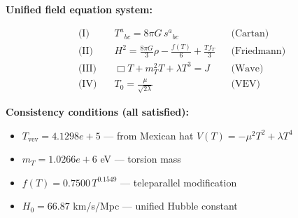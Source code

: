 
\textbf{Unified field equation system:}

\begin{align}
  \text{(I)} \quad & T^a{}_{bc} = 8\pi G \, s^a{}_{bc} && \text{(Cartan)} \\
  \text{(II)} \quad & H^2 = \frac{8\pi G}{3}\rho - \frac{f(T)}{6} + \frac{Tf_T}{3} && \text{(Friedmann)} \\
  \text{(III)} \quad & \Box T + m_T^2 T + \lambda T^3 = J && \text{(Wave)} \\
  \text{(IV)} \quad & T_0 = \frac{\mu}{\sqrt{2\lambda}} && \text{(VEV)}
\end{align}

\textbf{Consistency conditions (all satisfied):}
\begin{itemize}
  \item $T_{\text{vev}} = 4.1298e+5$ — from Mexican hat $V(T) = -\mu^2 T^2 + \lambda T^4$
  \item $m_T = 1.0266e+6$ eV — torsion mass
  \item $f(T) = 0.7500 \, T^{0.1549}$ — teleparallel modification
  \item $H_0 = 66.87$ km/s/Mpc — unified Hubble constant
\end{itemize}